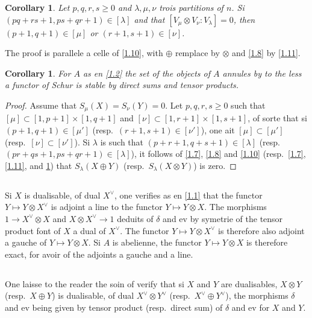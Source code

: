 \documentclass[11pt,a4paper]{article}
\theoremstyle{plain}
\newtheorem{corollary}[theorem]{Corollary}
\theoremstyle{definition}
\newcommand{\ev}{\mathrm{ev}}
\begin{document}
\begin{corollary}\label{1.12}
Let $p,q,r,s\geq0$ and $\lambda,\mu,\nu$ trois partitions of $n$. Si $(pq+rs+1,ps+qr+1)\in[\lambda]$ and that $[V_\mu\otimes V_\nu:V_\lambda]=0$, then $(p+1,q+1)\in[\mu]$ or $(r+1,s+1)\in[\nu]$.
\end{corollary}

The proof is parallele a celle of \ref{1.10}, with $\oplus$ remplace by $\otimes$ and \ref{1.8} by \ref{1.11}.

\begin{corollary}\label{1.13}
For $A$ as en \ref{1.2} the set of the objects of $A$ annules by to the less a functor of Schur is stable by direct sums and tensor products.
\end{corollary}

\begin{proof}
Assume that $S_\mu(X)=S_\nu(Y)=0$. Let $p,q,r,s\geq0$ such that $[\mu]\subset[1,p+1]\times[1,q+1]$ and $[\nu]\subset[1,r+1]\times[1,s+1]$, of sorte that si $(p+1,q+1)\in[\mu']$ (resp.~$(r+1,s+1)\in[\nu']$), one ait $[\mu]\subset[\mu']$ (resp.~$[\nu]\subset[\nu']$). Si $\lambda$ is such that $(p+r+1,q+s+1)\in[\lambda]$ (resp.~$(pr+qs+1,ps+qr+1)\in[\lambda]$), it follows of \ref{1.7}, \ref{1.8} and \ref{1.10} (resp.~\ref{1.7}, \ref{1.11}, and \ref{1.12}) that $S_\lambda(X\oplus Y)$ (resp.~$S_\lambda(X\otimes Y)$) is zero.
\end{proof}

\subsection{}\label{1.14}

Si $X$ is dualisable, of dual $X^\vee$, one verifies as en \ref{1.1} that the functor $Y\mapsto Y\otimes X^\vee$ is adjoint a line to the functor $Y\mapsto Y\otimes X$. The morphisms $1\to X^\vee\otimes X$ and $X\otimes X^\vee\to 1$ deduits of $\delta$ and $\ev$ by symetrie of the tensor product font of $X$ a dual of $X^\vee$. The functor $Y\mapsto Y\otimes X^\vee$ is therefore also adjoint a gauche of $Y\mapsto Y\otimes X$. Si $A$ is abelienne, the functor $Y\mapsto Y\otimes X$ is therefore exact, for avoir of the adjoints a gauche and a line.

\subsection{}\label{1.15}

One laisse to the reader the soin of verify that si $X$ and $Y$ are dualisables, $X\otimes Y$ (resp.~$X\oplus Y$) is dualisable, of dual $X^\vee\otimes Y^\vee$ (resp.~$X^\vee\oplus Y^\vee$), the morphisms $\delta$ and $\ev$ being given by tensor product (resp.~direct sum) of $\delta$ and $\ev$ for $X$ and $Y$.
\end{document}
